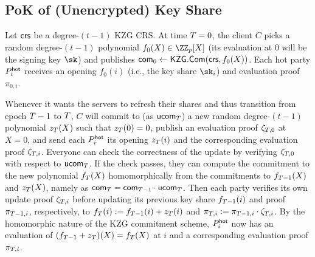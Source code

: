 \subsection{PoK of (Unencrypted) Key Share}\label{subsec:unenc_pok}

Let $\mathsf{crs}$ be a degree-$(t-1)$ KZG CRS. At time $T=0$, the client $C$ picks a random degree-$(t-1)$ polynomial $f_0(X) \in \ZZ_p[X]$ (its evaluation at 0 will be the signing key $\sk$) and publishes $\mathsf{com}_0 \gets \mathsf{KZG}.\mathsf{Com}(\mathsf{crs}, f_0(X))$. 
Each hot party $P_i^{\mathsf{hot}}$ receives an opening $f_0(i)$ (i.e., the key share $\sk_i$) and evaluation proof $\pi_{0,i}$. 

Whenever it wants the servers to refresh their shares and thus transition from epoch $T-1$ to $T$, $C$ will commit to (as $\mathsf{ucom}_{T}$) a new random degree-$(t-1)$ polynomial $z_{T}(X)$ such that $z_{T}(0) = 0$, publish an evaluation proof $\zeta_{T,0}$ at $X=0$, and send each $P_i^{\mathsf{hot}}$ its opening $z_{T}(i)$ and the corresponding evaluation proof $\zeta_{T,i}$. Everyone can check the correctness of the update by verifying $\zeta_{T,0}$ with respect to $\mathsf{ucom}_{T}$. If the check passes, they can compute the commitment to the new polynomial $f_{T}(X)$ homomorphically from the commitments to $f_{T-1}(X)$ and $z_{T}(X)$, namely as $\mathsf{com}_{T} = \mathsf{com}_{T-1} \cdot \mathsf{ucom}_{T}$.
Then each party verifies its own update proof $\zeta_{T,i}$ before updating its previous key share $f_{T-1}(i)$ and proof $\pi_{T-1,i}$, respectively, to $f_{T}(i) := f_{T-1}(i) + z_{T}(i)$ and $\pi_{T,i} := \pi_{T-1,i} \cdot \zeta_{T,i}$. By the homomorphic nature of the KZG commitment scheme, $P_i^{\mathsf{hot}}$ now has an evaluation of $(f_{T-1} + z_{T})(X) = f_{T}(X)$ at $i$ and a corresponding evaluation proof $\pi_{T,i}$. 

